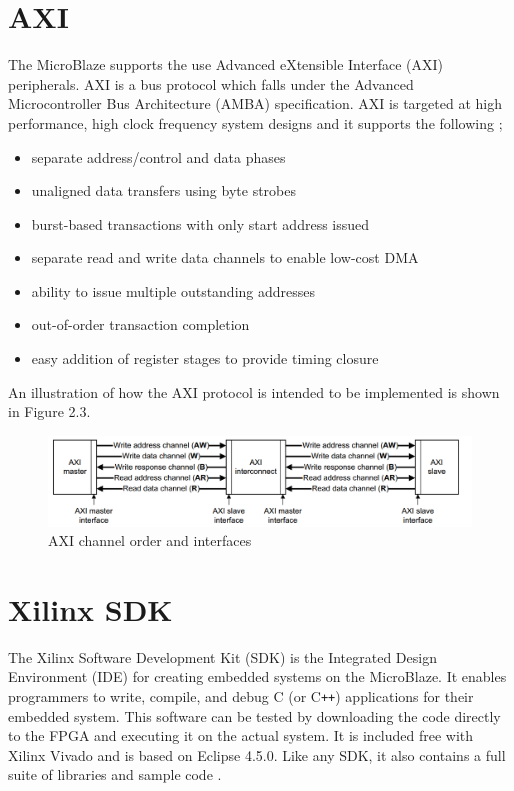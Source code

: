 \documentclass[12pt,a4paper]{report} %
\begin{document}
\section{AXI}
The MicroBlaze supports the use Advanced eXtensible Interface (AXI) peripherals. AXI is a bus protocol which falls under the Advanced Microcontroller Bus Architecture (AMBA) specification. AXI is targeted at high performance, high clock frequency system designs and it supports the following \cite{axi};
\begin{itemize}
\item separate address/control and data phases
\item unaligned data transfers using byte strobes
\item burst-based transactions with only start address issued
\item separate read and write data channels to enable low-cost DMA
\item ability to issue multiple outstanding addresses
\item out-of-order transaction completion
\item easy addition of register stages to provide timing closure
\end{itemize}
An illustration of how the AXI protocol is intended to be implemented is shown in Figure 2.3.
\begin{figure}[ht]
\centerline{\includegraphics[width=1.0\textwidth]{diagrams/image6}}
\caption[AXI channel order and interfaces]{AXI channel order and interfaces \cite{axi}}
\end{figure}
\section{Xilinx SDK}
The Xilinx Software Development Kit (SDK) is the Integrated Design Environment (IDE) for creating embedded systems on the MicroBlaze.
It enables programmers to write, compile, and debug C (or C\texttt{++}) applications for their embedded system.
This software can be tested by downloading the code directly to the FPGA and executing it on the actual system.
It is included free with Xilinx Vivado and is based on Eclipse 4.5.0.
Like any SDK, it also contains a full suite of libraries and sample code \cite{xsdk}.
\end{document}
